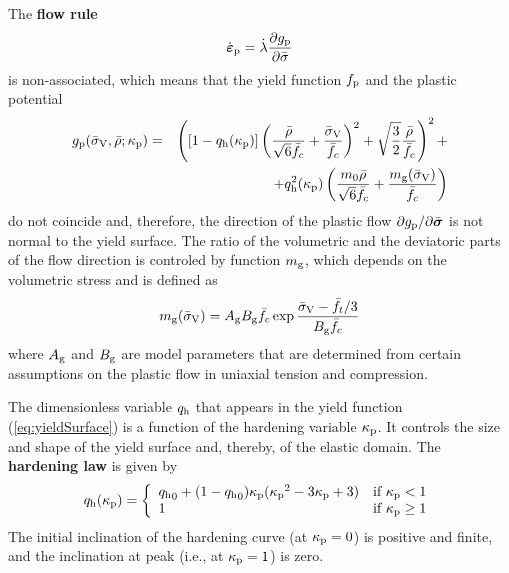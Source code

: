 \documentclass[a4paper]{article}
\newcommand{\mbf}[1]{\mbox{\boldmath$#1$}}
\newcommand{\bea}{\begin{eqnarray}}
\newcommand{\eea}{\end{eqnarray}}
\newcommand{\eps} {\mbf{\varepsilon}}
\newcommand{\vsig}{\mbf{\sigma}}%
\begin{document}
The {\bf flow rule} 
%
\begin{equation} \label{eq:flowRuleDPM}
\dot{\mbf{\eps}}_{\rm p} = \dot{\lambda} \frac{\partial g_{\rm p}}{\partial\bar{\sigma}} 
\end{equation}
%
is non-associated, which means that the yield function $f_{\rm p}$ and the plastic potential 
\bea\nonumber
g_{\rm p}(\bar{\sigma}_{\rm V},\bar{\rho};\kappa_{\rm p})&=&\left(\left[1-q_{\rm{h}}(\kappa_{\rm p})\right] \left( \frac{\bar{\rho}} {\sqrt{6}\fc} + \frac{\bar{\sigma}_{\rm V}}{\fc} \right)^2 + \sqrt{\frac{3}{2}} \frac {\bar{\rho}}{\fc} \right)^2 +\\
&&+q_{\rm{h}}^2(\kappa_{\rm p}) \left( \frac{m_0 \bar{\rho}}{\sqrt{6}\fc} + \frac{m_{\rm g}(\bar{\sigma}_{\rm V})}{\fc} \right)
 \label{eq:plasticPotential}
\eea
do not coincide and, therefore, the direction of the plastic flow $\partial g_{\rm p}/\partial\bar{\vsig}$ is not normal to the yield surface.
The ratio of the volumetric and the deviatoric parts of the flow direction is controled by function $m_{\rm g}$, which depends on the volumetric stress and is defined as 
\begin{equation} \label{eq:mg}
m_{\rm g}(\bar{\sigma}_{\rm V})=A_{\rm g}B_{\rm g}\bar{f}_c \exp{\frac{\bar{\sigma}_{\rm V} -\bar{f}_t/3}{B_{\rm g}\bar{f}_c}}
\end{equation}
%
where $A_{\rm g}$ and $B_{\rm g}$ are model parameters that are determined from certain assumptions on the plastic flow in uniaxial tension and compression.

The dimensionless variable $q_{\rm h}$ that appears in the yield function (\ref{eq:yieldSurface}) is a function of the hardening variable $\kappa_{\rm p}$. It controls the size and shape of the yield surface and, thereby, of the elastic domain. 
The {\bf hardening law} is given by
%
\begin{equation} \label{eq:hardeningLaw}
q_{\rm h}(\kappa_{\rm p}) = \left\{ \begin{array}{ll}
{q_{\rm h}}_0 + (1-{q_{\rm h}}_0)\kappa_{\rm p}({\kappa_{\rm p}}^2 - 3\kappa_{\rm p}+3) & \mbox{if $\kappa_{\rm p} < 1$} \\
1 & \mbox{if $\kappa_{\rm p} \ge 1$}
\end{array}
\right.
\end{equation}
%
The initial inclination of the hardening curve (at $\kappa_{\rm p}=0$) is positive and finite, and the inclination at peak (i.e., at $\kappa_{\rm p} = 1$) is zero.
\end{document}
